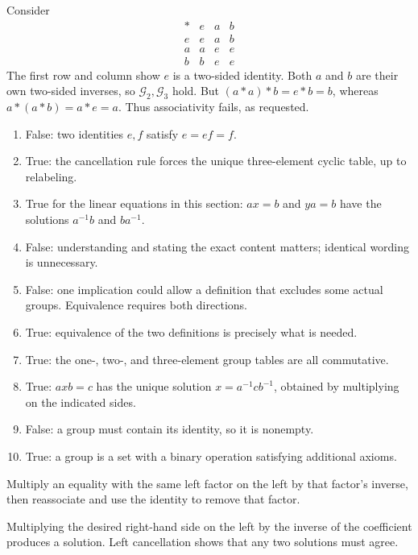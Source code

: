 
Consider
\[\begin{array}{c|ccc}*&e&a&b\\\hline e&e&a&b\\a&a&e&e\\b&b&e&e\end{array}\]
The first row and column show $e$ is a two-sided identity. Both $a$ and $b$ are their own two-sided inverses, so $\mathcal G_2,\mathcal G_3$ hold. But $(a*a)*b=e*b=b$, whereas $a*(a*b)=a*e=a$. Thus associativity fails, as requested.


\begin{enumerate}[label=(\alph*)]
\item False: two identities $e,f$ satisfy $e=ef=f$.
\item True: the cancellation rule forces the unique three-element cyclic table, up to relabeling.
\item True for the linear equations in this section: $ax=b$ and $ya=b$ have the solutions $a^{-1}b$ and $ba^{-1}$.
\item False: understanding and stating the exact content matters; identical wording is unnecessary.
\item False: one implication could allow a definition that excludes some actual groups. Equivalence requires both directions.
\item True: equivalence of the two definitions is precisely what is needed.
\item True: the one-, two-, and three-element group tables are all commutative.
\item True: $axb=c$ has the unique solution $x=a^{-1}cb^{-1}$, obtained by multiplying on the indicated sides.
\item False: a group must contain its identity, so it is nonempty.
\item True: a group is a set with a binary operation satisfying additional axioms.
\end{enumerate}


Multiply an equality with the same left factor on the left by that factor's inverse, then reassociate and use the identity to remove that factor.


Multiplying the desired right-hand side on the left by the inverse of the coefficient produces a solution. Left cancellation shows that any two solutions must agree.

